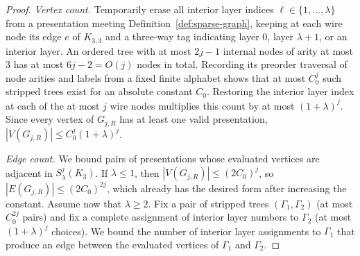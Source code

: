 \begin{proof}
\emph{Vertex count.} Temporarily erase all interior layer indices $\ell\in\{1,\ldots,\lambda\}$ from a presentation meeting Definition~\ref{def:sparse-graph}, keeping at each wire node its edge $e$ of $K_{3,3}$ and a three-way tag indicating layer $0$, layer $\lambda+1$, or an interior layer. An ordered tree with at most $2j-1$ internal nodes of arity at most $3$ has at most $6j-2=O(j)$ nodes in total. Recording its preorder traversal of node arities and labels from a fixed finite alphabet shows that at most $C_0^j$ such stripped trees exist for an absolute constant $C_0$. Restoring the interior layer index at each of the at most $j$ wire nodes multiplies this count by at most $(1+\lambda)^j$. Since every vertex of $G_{j,R}$ has at least one valid presentation, $|V(G_{j,R})|\le C_0^j(1+\lambda)^j$.

\emph{Edge count.} We bound pairs of presentations whose evaluated vertices are adjacent in $S^j_\lambda(K_3)$. If $\lambda\le1$, then $|V(G_{j,R})|\le (2C_0)^j$, so $|E(G_{j,R})|\le (2C_0)^{2j}$, which already has the desired form after increasing the constant. Assume now that $\lambda\ge2$. Fix a pair of stripped trees $(\Gamma_1,\Gamma_2)$ (at most $C_0^{2j}$ pairs) and fix a complete assignment of interior layer numbers to $\Gamma_2$ (at most $(1+\lambda)^j$ choices). We bound the number of interior layer assignments to $\Gamma_1$ that produce an edge between the evaluated vertices of $\Gamma_1$ and $\Gamma_2$.


\end{proof}
